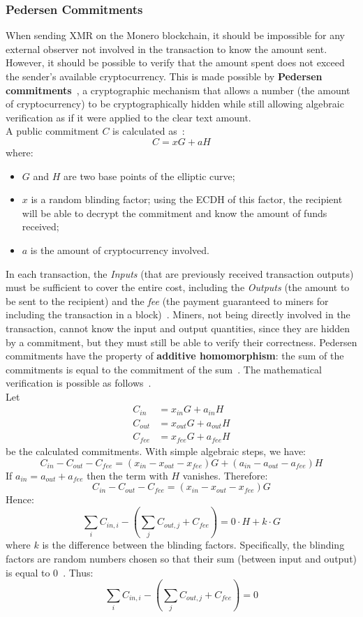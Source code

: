 \documentclass[conference]{IEEEtran}
\begin{document}
\subsubsection{Pedersen Commitments}
When sending XMR on the Monero blockchain, it should be impossible for any external observer not involved in the transaction to know the amount sent. However, it should be possible to verify that the amount spent does not exceed the sender's available cryptocurrency. This is made possible by \textbf{Pedersen commitments}~\cite{pedersen_commitments}, a cryptographic mechanism that allows a number (the amount of cryptocurrency) to be cryptographically hidden while still allowing algebraic verification as if it were applied to the clear text amount.\\
A public commitment $C$ is calculated as~\cite{ringct, zero_to_monero_2}:
\[
C = xG + aH
\]
where:
\begin{itemize}
\item $G$ and $H$ are two base points of the elliptic curve;
\item $x$ is a random blinding factor; using the ECDH of this factor, the recipient will be able to decrypt the commitment and know the amount of funds received;
\item $a$ is the amount of cryptocurrency involved.
\end{itemize}
In each transaction, the \textit{Inputs} (that are previously received transaction outputs) must be sufficient to cover the entire cost, including the \textit{Outputs} (the amount to be sent to the recipient) and the \textit{fee} (the payment guaranteed to miners for including the transaction in a block)~\cite{zero_to_monero_2}. Miners, not being directly involved in the transaction, cannot know the input and output quantities, since they are hidden by a commitment, but they must still be able to verify their correctness. Pedersen commitments have the property of \textbf{additive homomorphism}: the sum of the commitments is equal to the commitment of the sum~\cite{zero_to_monero_2}. The mathematical verification is possible as follows~\cite{zero_to_monero_2}.\\
Let
\begin{align*}
C_{in} &= x_{in}G + a_{in}H \\
C_{out} &= x_{out}G + a_{out}H \\
C_{fee} &= x_{fee}G + a_{fee}H
\end{align*}
be the calculated commitments. With simple algebraic steps, we have:
\[
C_{in} - C_{out} - C_{fee} = (x_{in} - x_{out} - x_{fee})G + (a_{in} - a_{out} - a_{fee})H
\]
If $a_{in} = a_{out} + a_{fee}$ then the term with $H$ vanishes. Therefore:
\[
C_{in} - C_{out} - C_{fee} = (x_{in} - x_{out} - x_{fee})G
\]
Hence:
\[
\sum_{i} C_{in, i} - \left( \sum_{j} C_{out, j} + C_{fee} \right) = 0 \cdot H + k \cdot G
\]
where $k$ is the difference between the blinding factors. Specifically, the blinding factors are random numbers chosen so that their sum (between input and output) is equal to 0~\cite{zero_to_monero_2, pedersen_commitments_relations_detail}. Thus:
\[
\sum_{i} C_{in, i} - \left( \sum_{j} C_{out, j} + C_{fee} \right) = 0
\]
\end{document}
